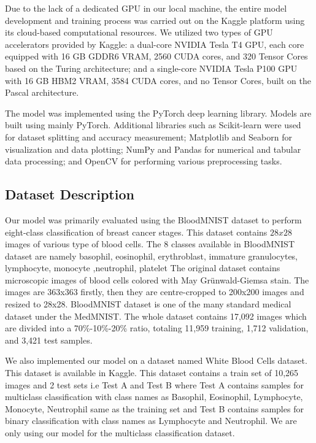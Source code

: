 \documentclass[preprint,12pt]{elsarticle}
\begin{document}
Due to the lack of a dedicated GPU in our local machine, the entire model development and training process was carried out on the Kaggle platform using its cloud-based computational resources. We utilized two types of GPU accelerators provided by Kaggle: a dual-core NVIDIA Tesla T4 GPU, each core equipped with 16 GB GDDR6 VRAM, 2560 CUDA cores, and 320 Tensor Cores based on the Turing architecture; and a single-core NVIDIA Tesla P100 GPU with 16 GB HBM2 VRAM, 3584 CUDA cores, and no Tensor Cores, built on the Pascal architecture.

The model was implemented using the PyTorch deep learning library. Models are built using mainly PyTorch. Additional libraries such as Scikit-learn were used for dataset splitting and accuracy measurement; Matplotlib and Seaborn for visualization and data plotting; NumPy and Pandas for numerical and tabular data processing; and OpenCV for performing various preprocessing tasks.

\FloatBarrier
\subsection{Dataset Description}

Our model was primarily evaluated using the BloodMNIST dataset to perform eight-class classification of breast cancer stages. This dataset contains $28x28$ images of various type of blood cells. The 8 classes available in BloodMNIST dataset are namely basophil, eosinophil, erythroblast, immature granulocytes, lymphocyte, monocyte ,neutrophil, platelet The original dataset contains microscopic images of blood cells colored with May Grünwald-Giemsa stain. The images are 363x363 firstly, then they are centre-cropped to 200x200 images and resized to 28x28. BloodMNIST dataset is one of the many standard medical dataset under the MedMNIST. The whole dataset contains 17,092 images which are divided into a 70\%-10\%-20\% ratio, totaling 11,959 training, 1,712 validation, and 3,421 test samples.

We also implemented our model on a dataset named White Blood Cells dataset. This dataset is available in Kaggle. This dataset contains a train set of 10,265 images and 2 test sets i.e Test A and Test B where Test A contains samples for multiclass classification with class names as Basophil, Eosinophil, Lymphocyte, Monocyte, Neutrophil same as the training set and Test B contains samples for binary classification with class names as Lymphocyte and Neutrophil. We are only using our model for the multiclass classification dataset. 
\end{document}
